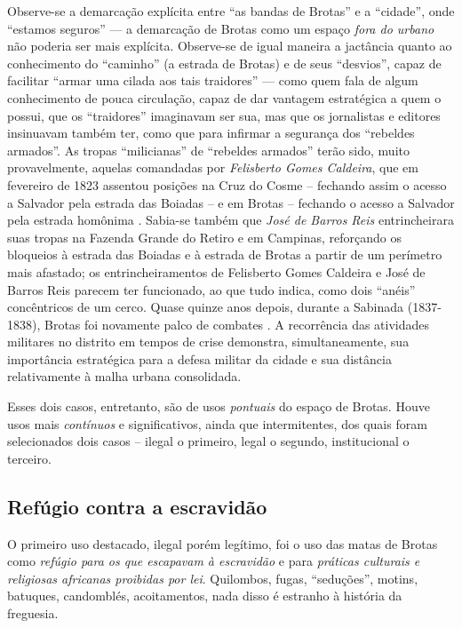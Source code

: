 Observe-se a demarcação explícita entre ``as bandas de Brotas'' e a ``cidade'', onde ``estamos seguros'' --- a demarcação de Brotas como um espaço \textit{fora do urbano} não poderia ser mais explícita. Observe-se de igual maneira a jactância quanto ao conhecimento do ``caminho'' (a estrada de Brotas) e de seus ``desvios'', capaz de facilitar ``armar uma cilada aos tais traidores'' --- como quem fala de algum conhecimento de pouca circulação, capaz de dar vantagem estratégica a quem o possui, que os ``traidores'' imaginavam ser sua, mas que os jornalistas e editores insinuavam também ter, como que para infirmar a segurança dos ``rebeldes armados''. As tropas ``milicianas'' de ``rebeldes armados'' terão sido, muito provavelmente, aquelas comandadas por \textit{Felisberto Gomes Caldeira}, que em fevereiro de 1823 assentou posições na Cruz do Cosme -- fechando assim o acesso a Salvador pela estrada das Boiadas -- e em Brotas -- fechando o acesso a Salvador pela estrada homônima \cite[p.~248]{ruy_camara_1953}. Sabia-se também que \textit{José de Barros Reis} entrincheirara suas tropas na Fazenda Grande do Retiro e em Campinas\cite[p.~248]{ruy_camara_1953}, reforçando os bloqueios à estrada das Boiadas e à estrada de Brotas a partir de um perímetro mais afastado; os entrincheiramentos de Felisberto Gomes Caldeira e José de Barros Reis parecem ter funcionado, ao que tudo indica, como dois ``anéis'' concêntricos de um cerco. Quase quinze anos depois, durante a Sabinada (1837-1838), Brotas foi novamente palco de combates \cite[p.~536]{ruy_politica_1949}. A recorrência das atividades militares no distrito em tempos de crise demonstra, simultaneamente, sua importância estratégica para a defesa militar da cidade e sua distância relativamente à malha urbana consolidada.

Esses dois casos, entretanto, são de usos \textit{pontuais} do espaço de Brotas. Houve usos mais \textit{contínuos} e significativos, ainda que intermitentes, dos quais foram selecionados dois casos -- ilegal o primeiro, legal o segundo, institucional o terceiro.

\subsection{Refúgio contra a escravidão}\label{subsec:refugioescrav}

O primeiro uso destacado, ilegal porém legítimo, foi o uso das matas de Brotas como \textit{refúgio para os que escapavam à escravidão} e para \textit{práticas culturais e religiosas africanas proibidas por lei}. Quilombos, fugas, ``seduções'', motins, batuques, candomblés, acoitamentos, nada disso é estranho à história da freguesia.

